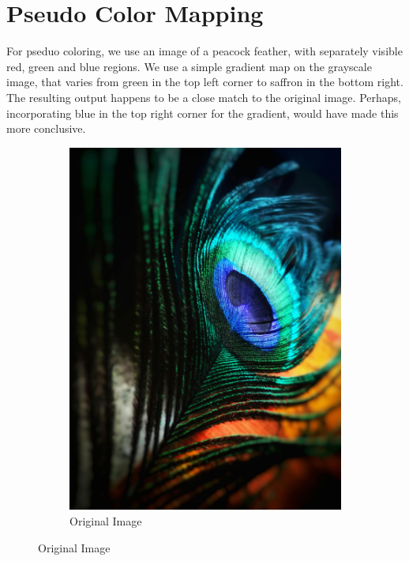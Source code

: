 \documentclass[a4paper]{article}
\begin{document}
\section{Pseudo Color Mapping}

For pseduo coloring, we use an image of a peacock feather, with separately visible red, green and blue regions. We use a simple gradient map on the grayscale image, that varies from green in the top left corner to saffron in the bottom right. The resulting output happens to be a close match to the original image. Perhaps, incorporating blue in the top right corner for the gradient, would have made this more conclusive.

\begin{figure}[H]
    \hfill
    \centering
    \begin{subfigure}[b]{.225\textwidth}
        \centering
        \includegraphics[width=\textwidth]{media/feather.jpg}
        \caption{Original Image}
    \end{subfigure}

\end{figure}
\end{document}
